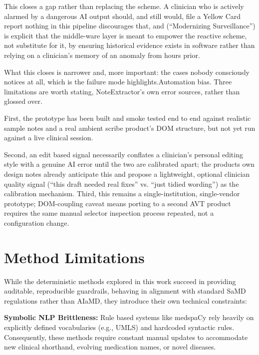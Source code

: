 \documentclass[11pt,a4paper]{article}
\begin{document}
This closes a gap rather than replacing the scheme. A clinician who is actively alarmed by a dangerous AI output should, and still would, file a Yellow Card report nothing in this pipeline discourages that, and (“Modernizing Surveillance”) is explicit that the middle-ware layer is meant to empower the reactive scheme, not substitute for it, by ensuring historical evidence exists in software rather than relying on a clinician’s memory of an anomaly from hours prior. 

What this closes is narrower and,  more important: the cases nobody consciously notices at all, which is the failure mode  highlights.Automation bias. Three limitations are worth stating,  NoteExtractor’s own error sources, rather than glossed over. 

First, the prototype has been built and smoke tested end to end against realistic sample notes and a real ambient scribe product’s DOM structure, but not yet run against a live clinical session.

Second, an edit based signal necessarily conflates a clinician’s personal editing style with a genuine AI error until the two are calibrated apart; the products own design notes already anticipate this and propose a lightweight, optional clinician quality signal (“this draft needed real fixes” vs. “just tidied wording”) as the calibration mechanism. 
Third, this remains a single-institution, single-vendor prototype; DOM-coupling caveat means porting to a second AVT product requires the same manual selector inspection process repeated, not a configuration change.

\section{Method Limitations}
\label{sec:Method Limitations}

While the deterministic methods explored in this work succeed in providing auditable, reproducible guardrails, behaving in alignment with standard SaMD regulations rather than  AIaMD,  they introduce their own technical constraints:  

\textbf{Symbolic NLP Brittleness:} Rule based systems like medspaCy rely heavily on explicitly defined vocabularies (e.g., UMLS) and hardcoded syntactic rules. Consequently, these methods require constant manual updates to accommodate new clinical shorthand, evolving medication names, or novel diseases. 
\end{document}
